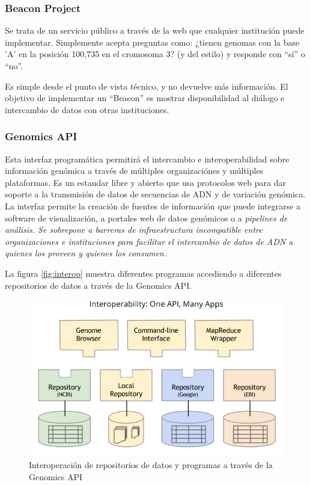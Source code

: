 \documentclass[
10pt, %
letterpaper, %
oneside, %
headinclude,footinclude, %
BCOR5mm, %
]{scrartcl}
\begin{document}
\subsubsection{Beacon Project}
Se trata de un servicio público a través de la web que cualquier
institución puede implementar. Simplemente acepta preguntas como:
¿tienen genomas con la base 'A' en la posición 100,735 en el cromosoma
3? (y del estilo) y responde con ``sí'' o ``no''.

Es simple desde el punto de vista técnico, y no devuelve más
información. El objetivo de implementar un ``Beacon'' es mostrar
disponibilidad al diálogo e intercambio de datos con otras
instituciones.\cite{_ga4gh_????}


\subsubsection{Genomics API}

Esta interfaz programática permitirá el intercambio e
interoperabilidad sobre información genómica a través de múltiples
organizaciónes y múltiples plataformas. Es un estandar libre y abierto
que usa protocolos web para dar soporte a la transmisión de datos de
secuencias de ADN y de variación genómica. La interfaz permite la
creación de fuentes de información que puede integrarse a software de
visualización, a portales web de datos genómicos o a \em{pipelines}\em
de análisis. Se sobrepone a barreras de infraestructura incompatible
entre organizaciones e instituciones para facilitar el intercambio de
datos de ADN a quienes los proveen y quienes los consumen.\cite{_ga4gh_????-1}

La figura \vref{fig:interop} muestra diferentes programas accediendo a
diferentes repositorios de datos a través de la Genomics API.

\begin{figure}
\centering 
\includegraphics[width=0.8\columnwidth]{GA4GH_API_interop.png} 
\caption[]{Interoperación de repositorios de datos y programas a
  través de la Genomics API}
\label{fig:interop} 
\end{figure}
\end{document}
